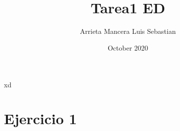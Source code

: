 \documentclass{article}
\title{Tarea1 ED}
\author{Arrieta Mancera Luis Sebastian}
\date{October 2020}
\begin{document}
xd

\maketitle

\section{Ejercicio 1}
\end{document}
